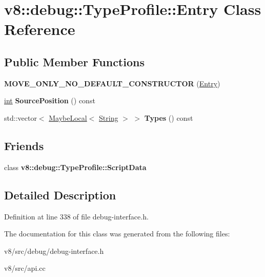 \hypertarget{classv8_1_1debug_1_1TypeProfile_1_1Entry}{}\section{v8\+:\+:debug\+:\+:Type\+Profile\+:\+:Entry Class Reference}
\label{classv8_1_1debug_1_1TypeProfile_1_1Entry}
\subsection*{Public Member Functions}
\begin{DoxyCompactItemize}
\item 
\mbox{\label{classv8_1_1debug_1_1TypeProfile_1_1Entry_ab686978a15bf9d214cba062aa01ff68c}} 
{\bfseries M\+O\+V\+E\+\_\+\+O\+N\+L\+Y\+\_\+\+N\+O\+\_\+\+D\+E\+F\+A\+U\+L\+T\+\_\+\+C\+O\+N\+S\+T\+R\+U\+C\+T\+OR} (\mbox{\hyperlink{classv8_1_1debug_1_1TypeProfile_1_1Entry}{Entry}})
\item 
\mbox{\label{classv8_1_1debug_1_1TypeProfile_1_1Entry_a0efb44ce494cf40931396e04753f3bc5}} 
\mbox{\hyperlink{classint}{int}} {\bfseries Source\+Position} () const
\item 
\mbox{\label{classv8_1_1debug_1_1TypeProfile_1_1Entry_a2e444e8c62e43e091823693fadbcea18}} 
std\+::vector$<$ \mbox{\hyperlink{classv8_1_1MaybeLocal}{Maybe\+Local}}$<$ \mbox{\hyperlink{classv8_1_1String}{String}} $>$ $>$ {\bfseries Types} () const
\end{DoxyCompactItemize}
\subsection*{Friends}
\begin{DoxyCompactItemize}
\item 
\mbox{\label{classv8_1_1debug_1_1TypeProfile_1_1Entry_acc65e42fa07d1e92900c7b3ef30d91b9}} 
class {\bfseries v8\+::debug\+::\+Type\+Profile\+::\+Script\+Data}
\end{DoxyCompactItemize}


\subsection{Detailed Description}


Definition at line 338 of file debug-\/interface.\+h.



The documentation for this class was generated from the following files\+:\begin{DoxyCompactItemize}
\item 
v8/src/debug/debug-\/interface.\+h\item 
v8/src/api.\+cc\end{DoxyCompactItemize}
